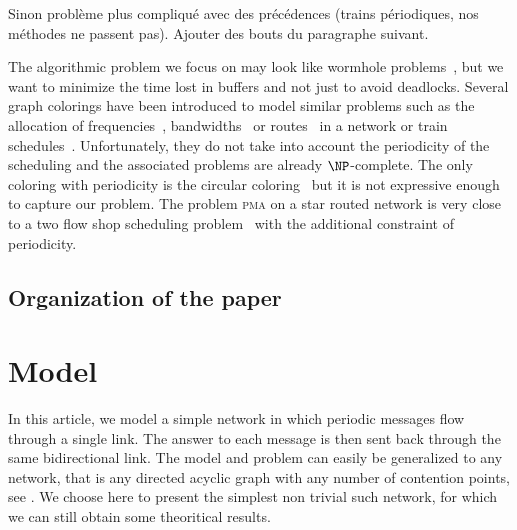 \documentclass[10pt, conference, letterpaper]{IEEEtran}
\newcommand\pma{\textsc{pma}\xspace}
\begin{document}
Sinon problème plus compliqué avec des précédences (trains périodiques, nos méthodes ne passent pas).
Ajouter des bouts du paragraphe suivant.


The algorithmic problem we focus on may look like wormhole problems~\cite{cole1996benefit}, but we want to minimize the time lost in buffers and not just to avoid deadlocks. Several graph colorings have been introduced to model similar problems such as the allocation of frequencies~\cite{borndorfer1998frequency}, bandwidths~\cite{erlebach2001complexity} or routes~\cite{cole1996benefit} in a network or train schedules~\cite{strotmann2007railway}. Unfortunately, they do not take into account the periodicity of the scheduling and the associated problems are already $\NP$-complete. The only coloring with periodicity is the circular coloring~\cite{zhou2013multiple} but it is not expressive enough to capture our problem. 
The problem \pma on a star routed network is very close to a two flow shop scheduling problem~\cite{yu2004minimizing}
with the additional constraint of periodicity.



\subsection{Organization of the paper}





\section{Model}


In this article, we model a simple network in which periodic messages flow through a single link. The answer to each message is then sent back through the same bidirectional link. The model and problem can easily be generalized to any network, that is any directed acyclic graph with any number of contention points, see \cite{dominique2018deterministic}. We choose here to present the simplest non trivial such network, for which we can still obtain some theoritical results. 
\end{document}
